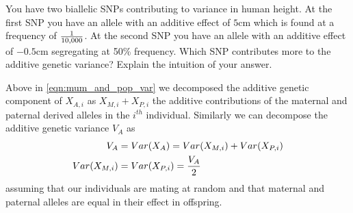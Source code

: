 \begin{question}{}
You have two biallelic SNPs contributing to variance in human height. At the first SNP you have an allele with an additive effect of $5$cm which is found at a frequency of $\nicefrac{1}{10,000}$. At the second SNP you have an allele with an additive effect of $-0.5$cm segregating at 50\% frequency. Which SNP contributes more to the additive genetic variance? Explain the intuition of your answer.
\end{question}

Above in \eqn \eqref{eqn:mum_and_pop_var} we decomposed the additive
genetic component of $X_{A,i}$ as $X_{M,i} + X_{P,i}$ the additive
contributions of the maternal and paternal derived alleles in the
$i^{th}$ individual. Similarly we can decompose the additive genetic
variance $V_A$ as
\begin{align}
  V_A&= Var(X_A) = Var(X_{M,i} ) + Var(X_{P,i} ) \\
       Var(X_{M,i} ) & =Var(X_{P,i} ) = \nicefrac{V_{A}}{2}  \label{eqn:mat_pat_var}
 \end{align} 
assuming that our individuals are mating at random and that maternal
and paternal alleles are equal in their effect in
offspring. 
 
